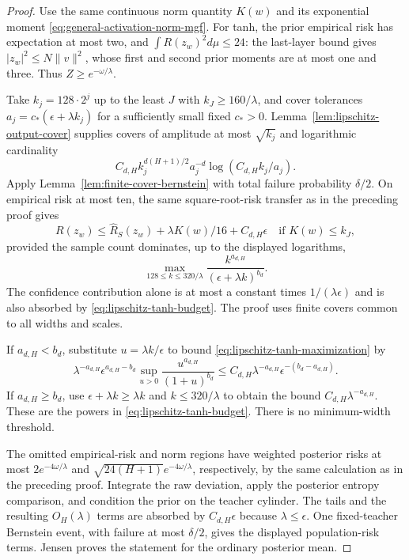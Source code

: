 \begin{proof}
Use the same continuous norm quantity $K(w)$ and its exponential moment
\eqref{eq:general-activation-norm-mgf}. For tanh, the prior empirical
risk has expectation at most two, and
$\int R(z_w)^2d\mu\leq24$: the last-layer bound gives
$|z_w|^2\leq N\|v\|^2$, whose first and second prior moments are at
most one and three. Thus $Z\geq e^{-\omega/\lambda}$.

Take $k_j=128\cdot2^j$ up to the least $J$ with $k_J\geq160/\lambda$,
and cover tolerances $a_j=c_*(\epsilon+\lambda k_j)$ for a sufficiently
small fixed $c_*>0$. Lemma~\ref{lem:lipschitz-output-cover} supplies
covers of amplitude at most $\sqrt{k_j}$ and logarithmic cardinality
\[
 C_{d,H}k_j^{d(H+1)/2}a_j^{-d}
                 \log(C_{d,H}k_j/a_j).
\]
Apply Lemma~\ref{lem:finite-cover-bernstein} with total failure
probability $\delta/2$. On empirical risk at most ten, the same
square-root-risk transfer as in the preceding proof gives
\[
 R(z_w)\leq\widehat R_S(z_w)+\lambda K(w)/16+C_{d,H}\epsilon
 \quad\text{if } K(w)\leq k_J,
\]
provided the sample count dominates, up to the displayed logarithms,
\begin{equation}
 \max_{128\leq k\leq320/\lambda}
       \frac{k^{a_{d,H}}}{(\epsilon+\lambda k)^{b_d}}.
 \label{eq:lipschitz-tanh-maximization}
\end{equation}
The confidence contribution alone is at most a constant times
$1/(\lambda\epsilon)$ and is also absorbed by
\eqref{eq:lipschitz-tanh-budget}. The proof uses finite covers common
to all widths and scales.

If $a_{d,H}<b_d$, substitute $u=\lambda k/\epsilon$ to bound
\eqref{eq:lipschitz-tanh-maximization} by
\[
 \lambda^{-a_{d,H}}\epsilon^{a_{d,H}-b_d}
      \sup_{u>0}\frac{u^{a_{d,H}}}{(1+u)^{b_d}}
 \leq C_{d,H}\lambda^{-a_{d,H}}
                         \epsilon^{-(b_d-a_{d,H})}.
\]
If $a_{d,H}\geq b_d$, use $\epsilon+\lambda k\geq\lambda k$ and
$k\leq320/\lambda$ to obtain the bound
$C_{d,H}\lambda^{-a_{d,H}}$.
These are the powers in \eqref{eq:lipschitz-tanh-budget}.
There is no minimum-width threshold.

The omitted empirical-risk and norm regions have weighted posterior
risks at most $2e^{-4\omega/\lambda}$ and
$\sqrt{24(H+1)}e^{-4\omega/\lambda}$, respectively, by the same
calculation as in the preceding proof. Integrate the raw deviation,
apply the posterior entropy comparison, and condition the prior on
the teacher cylinder. The tails and the resulting $O_H(\lambda)$
terms are absorbed by $C_{d,H}\epsilon$ because $\lambda\leq\epsilon$.
One fixed-teacher Bernstein event, with failure at most $\delta/2$,
gives the displayed population-risk terms. Jensen proves the statement
for the ordinary posterior mean.


\end{proof}
